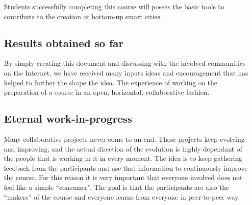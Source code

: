 \documentclass[oneside]{book}   %
\begin{document}
Students successfully completing this course will posses the basic tools to contribute to the creation of bottom-up smart cities.

\subsection{Results obtained so far}

By simply creating this document and discussing with the involved communities on the Internet, we have received many inputs ideas and encouragement that has helped to further the shape the idea.
The experience of working on the preparation of a course in an open, horizontal, collaborative fashion.

\subsection{Eternal work-in-progress}

Many collaborative projects never come to an end.
These projects keep evolving and improving, and the actual direction of the evolution is highly dependant of the people that is working in it in every moment.
The idea is to keep gathering feedback from the participants and use that information to continuously improve the course.
For this reason it is very important that everyone involved does not feel like a simple ``consumer''.
The goal is that the participants are also the ``makers'' of the course and everyone learns from everyone in peer-to-peer way.

% 
% 
% 
\end{document}
